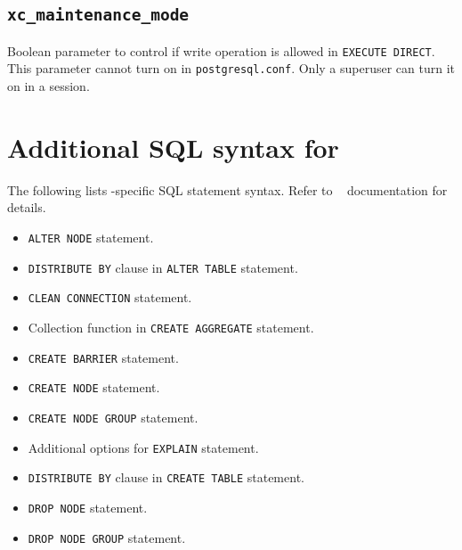 
\subsection*{\label{subsec:maintenanceMode}\texttt{xc\_maintenance\_mode}}

  Boolean parameter to control if write operation is allowed in {\tt EXECUTE DIRECT}.
  This parameter cannot turn on in {\tt postgresql.conf}.
  Only a superuser can turn it on in a session.



\section{\label{sec:syntax}Additional SQL syntax for \XC}

  The following lists \XC-specific SQL statement syntax.
  Refer to \XC~ documentation for details.
  
  \begin{itemize}
	  \item \texttt{ALTER NODE} statement.
	  \item \texttt{DISTRIBUTE BY} clause in \texttt{ALTER TABLE} statement.
	  \item\texttt{CLEAN CONNECTION} statement.
	  \item Collection function in \texttt{CREATE AGGREGATE} statement.
	  \item \texttt{CREATE BARRIER} statement.
	  \item \texttt{CREATE NODE} statement.
	  \item \texttt{CREATE NODE GROUP} statement.
	  \item Additional options for \texttt{EXPLAIN} statement.
	  \item \texttt{DISTRIBUTE BY} clause in \texttt{CREATE TABLE} statement.
	  \item \texttt{DROP NODE} statement.
	  \item \texttt{DROP NODE GROUP} statement.
  \end{itemize}
